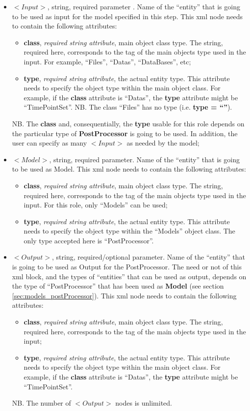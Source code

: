 \begin{itemize}
\item $<Input>$, string, required parameter . Name of the ``entity'' that is going to be used as input for the model specified in this step. This xml node needs to contain the following attributes:
\begin{itemize}
  \item \textbf{class}, \textit{required string attribute}, main object class type. The string, required here, corresponds to the tag of the main objects type used in the input. For example, ``Files'', ``Datas'', ``DataBases'', etc;
  \item \textbf{type}, \textit{required string attribute}, the actual entity type. This attribute needs to specify the object type within the main object class. For example, if the  \textbf{class} attribute is ``Datas'', the \textbf{type} attribute might be ``TimePointSet''. NB. The class ``Files'' has no type (i.e. \textbf{type = ``''}).
\end{itemize}
NB. The \textbf{class} and, consequentially,  the \textbf{type} usable for this role depends on the particular type of \textbf{PostProcessor} is going to be used. In addition, the user can specify as many $<Input>$ as needed by the model;
\item $<Model>$, string, required parameter. Name of the ``entity'' that is going to be used as Model. This xml node needs to contain the following attributes:
\begin{itemize}
  \item \textbf{class}, \textit{required string attribute}, main object class type. The string, required here, corresponds to the tag of the main objects type used in the input. For this role, only ``Models'' can be used;
  \item \textbf{type}, \textit{required string attribute}, the actual entity type. This attribute needs to specify the object type within the ``Models'' object class. The only type accepted here is ``PostProcessor''.
\end{itemize}
\item $<Output>$, string, required/optional parameter. Name of the ``entity'' that is going to be used as Output for the PostProcessor. The need or not of this xml block, and the types of ``entities'' that can be used as output, depends on the type of ``PostProcessor'' that has been used as \textbf{Model} (see section \ref{sec:models_postProcessor}). This xml node needs to contain the following attributes:
\begin{itemize}
  \item \textbf{class}, \textit{required string attribute}, main object class type. The string, required here, corresponds to the tag of the main objects type used in the input;
  \item \textbf{type}, \textit{required string attribute}, the actual entity type. This attribute needs to specify the object type within the main object class. For example, if the  \textbf{class} attribute is ``Datas'', the \textbf{type} attribute might be ``TimePointSet''.
\end{itemize}
NB. The number of $<Output>$ nodes is unlimited.
\end{itemize}

